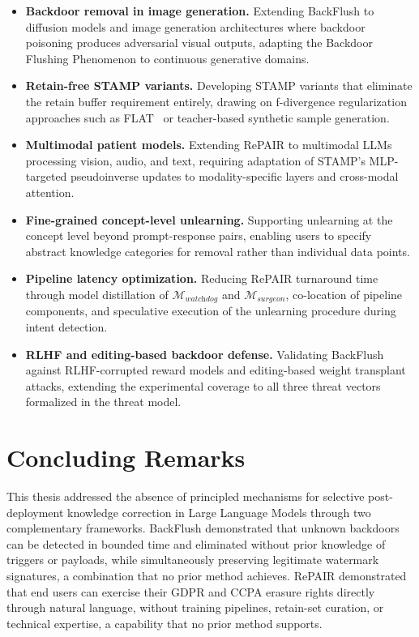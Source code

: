 \begin{itemize}
    \item \textbf{Backdoor removal in image generation.} Extending BackFlush to diffusion models and image generation architectures where backdoor poisoning produces adversarial visual outputs, adapting the Backdoor Flushing Phenomenon to continuous generative domains.

    \item \textbf{Retain-free STAMP variants.} Developing STAMP variants that eliminate the retain buffer requirement entirely, drawing on f-divergence regularization approaches such as FLAT~\citeauthor{wang2024llm} or teacher-based synthetic sample generation.

    \item \textbf{Multimodal patient models.} Extending RePAIR to multimodal LLMs processing vision, audio, and text, requiring adaptation of STAMP's MLP-targeted pseudoinverse updates to modality-specific layers and cross-modal attention.

    \item \textbf{Fine-grained concept-level unlearning.} Supporting unlearning at the concept level beyond prompt-response pairs, enabling users to specify abstract knowledge categories for removal rather than individual data points.

    \item \textbf{Pipeline latency optimization.} Reducing RePAIR turnaround time through model distillation of $\mathcal{M}_{\textit{watchdog}}$ and $\mathcal{M}_{\textit{surgeon}}$, co-location of pipeline components, and speculative execution of the unlearning procedure during intent detection.

    \item \textbf{RLHF and editing-based backdoor defense.} Validating BackFlush against RLHF-corrupted reward models and editing-based weight transplant attacks, extending the experimental coverage to all three threat vectors formalized in the threat model.
\end{itemize}


\section{Concluding Remarks}

This thesis addressed the absence of principled mechanisms for selective post-deployment knowledge correction in Large Language Models through two complementary frameworks. BackFlush demonstrated that unknown backdoors can be detected in bounded time and eliminated without prior knowledge of triggers or payloads, while simultaneously preserving legitimate watermark signatures, a combination that no prior method achieves. RePAIR demonstrated that end users can exercise their GDPR and CCPA erasure rights directly through natural language, without training pipelines, retain-set curation, or technical expertise, a capability that no prior method supports.

